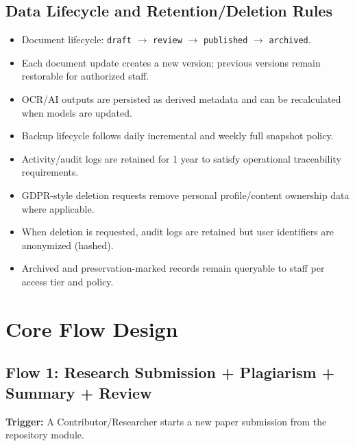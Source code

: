 \documentclass[12pt,a4paper]{article}
\begin{document}
\subsection*{Data Lifecycle and Retention/Deletion Rules}
\begin{itemize}
    \item Document lifecycle: \texttt{draft} $\rightarrow$ \texttt{review} $\rightarrow$ \texttt{published} $\rightarrow$ \texttt{archived}.
    \item Each document update creates a new version; previous versions remain restorable for authorized staff.
    \item OCR/AI outputs are persisted as derived metadata and can be recalculated when models are updated.
    \item Backup lifecycle follows daily incremental and weekly full snapshot policy.
    \item Activity/audit logs are retained for 1 year to satisfy operational traceability requirements.
    \item GDPR-style deletion requests remove personal profile/content ownership data where applicable.
    \item When deletion is requested, audit logs are retained but user identifiers are anonymized (hashed).
    \item Archived and preservation-marked records remain queryable to staff per access tier and policy.
\end{itemize}
\newpage
\section{Core Flow Design}
\subsection*{Flow 1: Research Submission + Plagiarism + Summary + Review}
\textbf{Trigger:} A Contributor/Researcher starts a new paper submission from the repository module.
\end{document}

